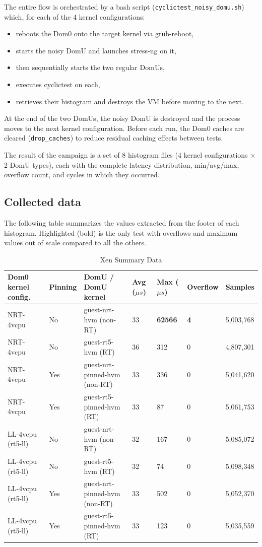 The entire flow is orchestrated by a bash script
(\texttt{cyclictest\_noisy\_domu.sh}) which, for each of the 4 kernel
configurations:

\begin{itemize}
\item
  reboots the Dom0 onto the target kernel via grub-reboot,
\item
  starts the noisy DomU and launches stress-ng on it,
\item
  then sequentially starts the two regular DomUs,
\item
  executes cyclictest on each,
\item
  retrieves their histogram and destroys the VM before moving to the
  next.
\end{itemize}

At the end of the two DomUs, the noisy DomU is destroyed and the process
moves to the next kernel configuration. Before each run, the Dom0 caches
are cleared (\texttt{drop\_caches}) to reduce residual caching effects
between tests.

The result of the campaign is a set of 8 histogram files (4 kernel
configurations × 2 DomU types), each with the complete latency
distribution, min/avg/max, overflow count, and cycles in which they
occurred.

\subsection{Collected data}\label{collected-data}

The following table summarizes the values extracted from the footer of
each histogram. Highlighted (bold) is the only test with overflows and
maximum values out of scale compared to all the others.

\begin{table}
\centering
\caption{Xen Summary Data}
\label{tab:xen:summary}
\begin{tabularx}{\linewidth}{@{}YYYYYYY@{}}
\toprule
\textbf{Dom0 kernel config.} & \textbf{Pinning} & \textbf{DomU / DomU kernel} & \textbf{Avg ($\mu s$)} & \textbf{Max ($\mu s$)} & \textbf{Overflow} & \textbf{Samples}\tabularnewline
\midrule
NRT-4vcpu & No & guest-nrt-hvm (non-RT) & 33 & \textbf{62566} & \textbf{4} & 5,003,768\tabularnewline
NRT-4vcpu & No & guest-rt5-hvm (RT) & 36 & 312 & 0 & 4,807,301\tabularnewline
NRT-4vcpu & Yes & guest-nrt-pinned-hvm (non-RT) & 33 & 336 & 0 & 5,041,620\tabularnewline
NRT-4vcpu & Yes & guest-rt5-pinned-hvm (RT) & 33 & 87 & 0 & 5,061,753\tabularnewline
LL-4vcpu (rt5-ll) & No & guest-nrt-hvm (non-RT) & 32 & 167 & 0 & 5,085,072\tabularnewline
LL-4vcpu (rt5-ll) & No & guest-rt5-hvm (RT) & 32 & 74 & 0 & 5,098,348\tabularnewline
LL-4vcpu (rt5-ll) & Yes & guest-nrt-pinned-hvm (non-RT) & 33 & 502 & 0 & 5,052,370\tabularnewline
LL-4vcpu (rt5-ll) & Yes & guest-rt5-pinned-hvm (RT) & 33 & 123 & 0 & 5,035,559\tabularnewline
\bottomrule
\end{tabularx}
\end{table}

